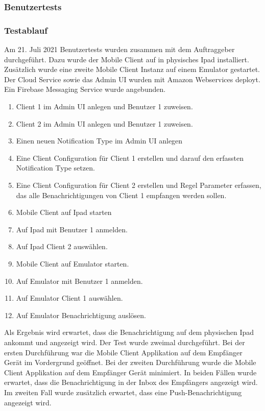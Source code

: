 \subsubsection*{Benutzertests}

\subsubsection*{Testablauf}

Am 21. Juli 2021 Benutzertests wurden zusammen mit dem Auftraggeber durchgeführt.
Dazu wurde der Mobile Client auf in physisches Ipad installiert.
Zusätzlich wurde eine zweite Mobile Client Instanz auf einem Emulator gestartet.
Der Cloud Service sowie das Admin UI wurden mit Amazon Webservices deployt.
Ein Firebase Messaging Service wurde angebunden.

\begin{enumerate}
    \item Client 1 im Admin UI anlegen und Benutzer 1 zuweisen.
    \item Client 2 im Admin UI anlegen und Benutzer 1 zuweisen.
    \item Einen neuen Notification Type im Admin UI anlegen
    \item Eine Client Configuration für Client 1 erstellen und darauf den erfassten Notification Type setzen.
    \item Eine Client Configuration für Client 2 erstellen und Regel Parameter erfassen, das alle Benachrichtigungen von Client 1 empfangen werden sollen.
    \item Mobile Client auf Ipad starten
    \item Auf Ipad mit Benutzer 1 anmelden.
    \item Auf Ipad Client 2 auswählen.
    \item Mobile Client auf Emulator starten.
    \item Auf Emulator mit Benutzer 1 anmelden.
    \item Auf Emulator Client 1 auswählen.
    \item Auf Emulator Benachrichtigung auslösen.
\end{enumerate}

Als Ergebnis wird erwartet, dass die Benachrichtigung auf dem physischen Ipad ankommt und angezeigt wird.
Der Test wurde zweimal durchgeführt.
Bei der ersten Durchführung war die Mobile Client Applikation auf dem Empfänger Gerät im Vordergrund geöffnet.
Bei der zweiten Durchführung wurde die Mobile Client Applikation auf dem Empfänger Gerät minimiert.
In beiden Fällen wurde erwartet, dass die Benachrichtigung in der Inbox des Empfängers angezeigt wird.
Im zweiten Fall wurde zusätzlich erwartet, dass eine Push-Benachrichtigung angezeigt wird.

